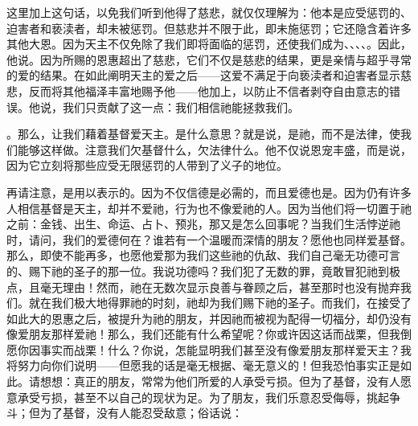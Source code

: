 这里加上这句话，以免我们听到他得了慈悲，就仅仅理解为：他本是应受惩罚的、迫害者和亵渎者，却未被惩罚。但慈悲并不限于此，即未施惩罚；它还隐含着许多其他大恩。因为天主不仅免除了我们即将面临的惩罚，还使我们成为、、、、。因此，他说。因为所赐的恩惠超出了慈悲，它们不仅是慈悲的结果，更是亲情与超乎寻常的爱的结果。在如此阐明天主的爱之后——这爱不满足于向亵渎者和迫害者显示慈悲，反而将其他福泽丰富地赐予他——他加上，以防止不信者剥夺自由意志的错误。他说，我们只贡献了这一点：我们相信祂能拯救我们。\par

。那么，让我们藉着基督爱天主。是什么意思？就是说，是祂，而不是法律，使我们能够这样做。注意我们欠基督什么，欠法律什么。他不仅说恩宠丰盛，而是说，因为它立刻将那些应受无限惩罚的人带到了义子的地位。\par

再请注意，是用以表示的。因为不仅信德是必需的，而且爱德也是。因为仍有许多人相信基督是天主，却并不爱祂，行为也不像爱祂的人。因为当他们将一切置于祂之前：金钱、出生、命运、占卜、预兆，那又是怎么回事呢？当我们生活悖逆祂时，请问，我们的爱德何在？谁若有一个温暖而深情的朋友？愿他也同样爱基督。那么，即使不能再多，也愿他爱那为我们这些祂的仇敌、我们自己毫无功德可言的、赐下祂的圣子的那一位。我说功德吗？我们犯了无数的罪，竟敢冒犯祂到极点，且毫无理由！然而，祂在无数次显示良善与眷顾之后，甚至那时也没有抛弃我们。就在我们极大地得罪祂的时刻，祂却为我们赐下祂的圣子。而我们，在接受了如此大的恩惠之后，被提升为祂的朋友，并因祂而被视为配得一切福分，却仍没有像爱朋友那样爱祂！那么，我们还能有什么希望呢？你或许因这话而战栗，但我倒愿你因事实而战栗！什么？你说，怎能显明我们甚至没有像爱朋友那样爱天主？我将努力向你们说明——但愿我的话是毫无根据、毫无意义的！但我恐怕事实正是如此。请想想：真正的朋友，常常为他们所爱的人承受亏损。但为了基督，没有人愿意承受亏损，甚至不以自己的现状为足。为了朋友，我们乐意忍受侮辱，挑起争斗；但为了基督，没有人能忍受敌意；俗话说：\par

